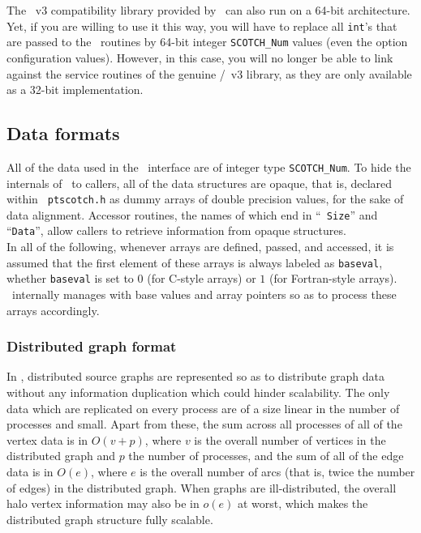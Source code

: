 The \metis\ v3 compatibility library provided by \scotch\ can also
run on a 64-bit architecture. Yet, if you are willing to use it this
way, you will have to replace all {\tt int}'s that are passed to the
\metis\ routines by 64-bit integer {\tt SCOTCH\_\lbt Num} values (even
the option configuration values). However, in this case, you will no
longer be able to link against the service routines of the genuine
\metis/\parmetis\ v3 library, as they are only available as a 32-bit
implementation.

\subsection{Data formats}

All of the data used in the \libscotch\ interface are of integer type
{\tt SCOTCH\_Num}. To hide the internals of \ptscotch\ to callers, all
of the data structures are opaque, that is, declared within {\tt
ptscotch.h} as dummy arrays of double precision values, for the sake of
data alignment. Accessor routines, the names of which end in ``{\tt
Size}'' and ``{\tt Data}'', allow callers to retrieve information from
opaque structures.
\\

In all of the following, whenever arrays are defined, passed, and
accessed, it is assumed that the first element of these arrays is
always labeled as {\tt baseval}, whether {\tt baseval} is set to $0$
(for C-style arrays) or $1$ (for Fortran-style arrays). \ptscotch\
internally manages with base values and array pointers so as to
process these arrays accordingly.

\subsubsection{Distributed graph format}
\label{sec-lib-format-dgraph}

In \ptscotch, distributed source graphs are represented so as to
distribute graph data without any information duplication which could
hinder scalability. The only data which are replicated on every
process are of a size linear in the number of processes and
small. Apart from these, the sum across all processes of all of the
vertex data is in $O(v+p)$, where $v$ is the overall number of
vertices in the distributed graph and $p$ the number of processes, and
the sum of all of the edge data is in $O(e)$, where $e$ is the overall
number of arcs (that is, twice the number of edges) in the distributed
graph. When graphs are ill-distributed, the overall halo vertex
information may also be in $o(e)$ at worst, which makes the distributed
graph structure fully scalable.

